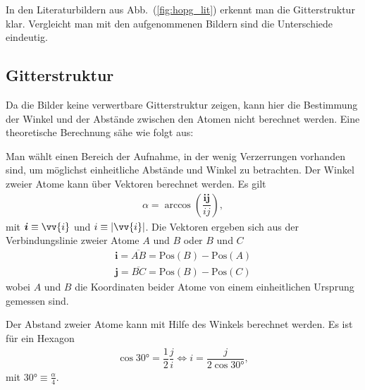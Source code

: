 \documentclass[sn-mathphys-num,iicol]{sn-jnl}
\theoremstyle{thmstyleone}
\theoremstyle{thmstyletwo}
\theoremstyle{thmstylethree}
\begin{document}
In den Literaturbildern aus Abb.\ (\ref{fig:hopg_lit}) erkennt man die Gitterstruktur klar.
Vergleicht man mit den aufgenommenen Bildern sind die Unterschiede eindeutig.

\subsection{Gitterstruktur}
Da die Bilder keine verwertbare Gitterstruktur zeigen, kann hier die Bestimmung der Winkel und der Abstände zwischen den Atomen nicht berechnet werden.
Eine theoretische Berechnung sähe wie folgt aus:

Man wählt einen Bereich der Aufnahme, in der wenig Verzerrungen vorhanden sind, um möglichst einheitliche Abstände und Winkel zu betrachten.
Der Winkel zweier Atome kann über Vektoren berechnet werden.
Es gilt
\begin{align} 
  \alpha =\arccos\left(\dfrac{\boldsymbol{i} \boldsymbol{j} }{ij}\right)
,\end{align} 
mit $\boldsymbol{i} \equiv\vv{i}$ und $i\equiv |\vv{i}|$.
Die Vektoren ergeben sich aus der Verbindungslinie zweier Atome $A$ und $B$ oder $B$ und $C$
\begin{align} 
  \boldsymbol{i} =\overline{AB}=\text{Pos}(B)-\text{Pos}(A)\\
  \boldsymbol{j} =\overline{BC}=\text{Pos}(B)-\text{Pos}(C)
\end{align} 
wobei $A$ und $B$ die Koordinaten beider Atome von einem einheitlichen Ursprung gemessen sind.

Der Abstand zweier Atome kann mit Hilfe des Winkels berechnet werden.
Es ist für ein Hexagon
\begin{align} 
  \cos \ang{30}=\dfrac{1}{2}\dfrac{j}{i}\Leftrightarrow i=\dfrac{j}{2\cos \ang{30}}
,\end{align} 
mit $\ang{30}\equiv \tfrac{\alpha }{4}$.

\end{document}
